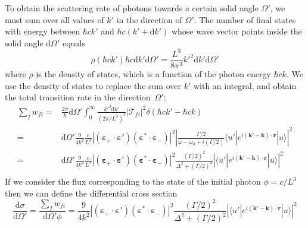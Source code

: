 \documentclass[11pt,letter]{article}
\newcommand{\bv}[1]{\ensuremath{\bm{#1}}}
\begin{document}
To obtain the scattering rate of photons towards a certain solid angle
$\Omega'$, we must sum over all values of $k'$ in the direction of $\Omega'$.
The number of final states with energy between $\hbar c k'$ and $\hbar c ( k' +
\mathrm{d}k')$  whose wave vector points inside the solid angle $\mathrm{d}
\Omega'$ equals 
\begin{equation}
    \rho( \hbar c k') \hbar c \mathrm{d} k' \mathrm{d} \Omega ' 
  = \frac{L^{3}}{8 \pi^{3} }  k'^{2} \mathrm{d} k' \mathrm{d} \Omega' 
\end{equation}
where $\rho$ is the density of states, which is a function of the photon energy
$\hbar c k$.  We use the density of states to replace the sum over $k'$ with an
integral,  and obtain the total transition rate in the direction~$\Omega'$: 
\begin{equation}
\begin{split}
  \sum_{f} w_{fi} = & 
   \frac{2\pi}{\hbar}  \mathrm{d} \Omega' 
      \int_{0}^{\infty} \frac{k'^{2} \mathrm{d} k' }{ (2\pi / L^{3} ) ^{3} } 
   | \mathcal{T}_{fi} |^{2} 
   \delta( \hbar c k' - \hbar c k )  \\ 
   = & 
   \mathrm{d} \Omega' \frac{9}{4 k^{2}} \frac{ c } {L^{3} }
        |(\bv{\varepsilon}_{+}\cdot \bv{\varepsilon}' )
                       (\bv{\varepsilon}^{*}\cdot \bv{\varepsilon}_{-} ) |^{2}
    \left|
    \frac{ \Gamma/2  }
        { \omega - \omega_{0} + i (\Gamma/2 ) }  
      \langle u' | e^{i(\bv{k}'-\bv{k}) \cdot\bv{r}} | u  \rangle
     \right| ^{2} \\ 
   = & 
   \mathrm{d} \Omega' \frac{9}{4 k^{2}} \frac{ c } {L^{3} }
        |(\bv{\varepsilon}_{+}\cdot \bv{\varepsilon}' )
                       (\bv{\varepsilon}^{*}\cdot \bv{\varepsilon}_{-} ) |^{2}
    \frac{ (\Gamma/2)^{2}  }
        { \Delta^{2} +  (\Gamma/2 )^{2} }
    \left|
      \langle u' | e^{i(\bv{k}'-\bv{k}) \cdot\bv{r}} | u  \rangle
\right| ^{2} \\ 
\end{split} 
\end{equation}
If we consider the flux corresponding to the state of the initial photon $\phi
= c/L^{3}$ then we can define the differential cross section 
\begin{equation}
 \frac{ \mathrm{d} \sigma } { \mathrm{d} \Omega'} =  
    \frac{\sum_{f} w_{fi} } { \mathrm{d} \Omega' \phi} = 
    \frac{9}{4 k^{2}} 
        |(\bv{\varepsilon}_{+}\cdot \bv{\varepsilon}' )
                       (\bv{\varepsilon}^{*}\cdot \bv{\varepsilon}_{-} ) |^{2}
    \frac{ (\Gamma/2)^{2}  }
        { \Delta^{2} +  (\Gamma/2 )^{2} }
    \left|
      \langle u' | e^{i(\bv{k}'-\bv{k}) \cdot\bv{r}} | u  \rangle
\right| ^{2}  
\end{equation}
\end{document}
